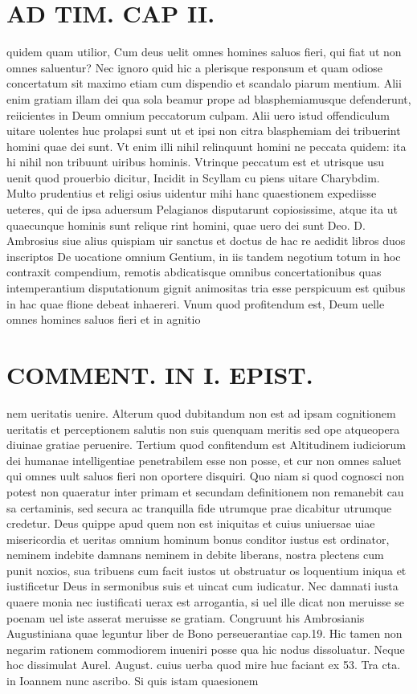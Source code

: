 \documentclass{article}
\begin{document}
\begin{pages}
\section*{AD TIM. CAP II. }
\marginpar{[ p.113 ]}\pstart quidem quam utilior, Cum deus uelit omnes homines saluos fieri, qui fiat ut non omnes saluentur? Nec ignoro quid hic a plerisque responsum et quam odiose concertatum sit maximo etiam cum dispendio et scandalo piarum mentium. Alii enim gratiam illam dei qua sola beamur prope ad blasphemiamusque defenderunt, reiicientes in Deum omnium peccatorum culpam. Alii uero istud offendiculum uitare uolentes huc prolapsi sunt ut et ipsi non citra blasphemiam dei tribuerint homini quae dei sunt. Vt enim illi nihil relinquunt homini ne peccata quidem: ita hi nihil non tribuunt uiribus hominis. Vtrinque peccatum est et utrisque usu uenit quod prouerbio dicitur, Incidit in Scyllam cu piens uitare Charybdim. Multo prudentius et religi osius uidentur mihi hanc quaestionem expediisse ueteres, qui de ipsa aduersum Pelagianos disputarunt copiosissime, atque ita ut quaecunque hominis sunt relique rint homini, quae uero dei sunt Deo. D. Ambrosius siue alius quispiam uir sanctus et doctus de hac re aedidit libros duos inscriptos De uocatione omnium Gentium, in iis tandem negotium totum in hoc contraxit compendium, remotis abdicatisque omnibus concertationibus quas intemperantium disputationum gignit animositas tria esse perspicuum est quibus in hac quae flione debeat inhaereri. Vnum quod profitendum est, Deum uelle omnes homines saluos fieri et in agnitio  \pend
\section*{COMMENT. IN I. EPIST. }\pstart nem ueritatis uenire. Alterum quod dubitandum non est ad ipsam cognitionem ueritatis et perceptionem salutis non suis quenquam meritis sed ope atqueopera diuinae gratiae peruenire. Tertium quod confitendum est Altitudinem iudiciorum dei humanae intelligentiae penetrabilem esse non posse, et cur non omnes saluet qui omnes uult saluos fieri non oportere disquiri. Quo niam si quod cognosci non potest non quaeratur inter primam et secundam definitionem non remanebit cau sa certaminis, sed secura ac tranquilla fide utrumque prae dicabitur utrumque credetur. Deus quippe apud quem non est iniquitas et cuius uniuersae uiae misericordia et ueritas omnium hominum bonus conditor iustus est ordinator, neminem indebite damnans neminem in debite liberans, nostra plectens cum punit noxios, sua tribuens cum facit iustos ut obstruatur os loquentium iniqua et iustificetur Deus in sermonibus suis et uincat cum iudicatur. Nec damnati iusta quaere monia nec iustificati uerax est arrogantia, si uel ille dicat non meruisse se poenam uel iste asserat meruisse se gratiam. Congruunt his Ambrosianis Augustiniana quae leguntur liber  de Bono perseuerantiae cap.19. Hic tamen non negarim rationem commodiorem inueniri posse qua hic nodus dissoluatur. Neque hoc dissimulat Aurel. August. cuius uerba quod mire huc faciant ex 53. Tra cta. in Ioannem nunc ascribo. Si quis istam quaesionem  \pend

\end{pages}
\end{document}
